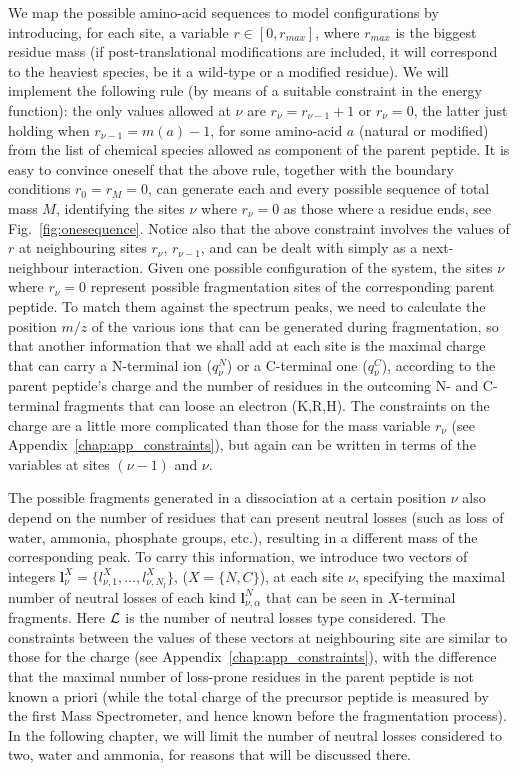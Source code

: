 We map the possible amino-acid sequences to model configurations by introducing,
for each site, a variable $r \in [0,r_{max}]$, where $ r_{max}$ is the biggest
residue mass (if post-translational modifications are included, it will
correspond to the heaviest species, be it a wild-type or a modified residue). We
will implement the following rule (by means of a suitable constraint in the
energy function): the only values allowed at $\nu$ are  $r_{\nu}=r_{\nu-1}+1$ or
$r_{\nu} = 0$, the latter just holding when $r_{\nu-1}=m(a)-1$, for some
amino-acid $a$ (natural or modified) from the list of chemical species allowed as
component of the parent peptide. It is easy to convince oneself that the above
rule, together with the boundary conditions  $r_0=r_M=0$, can generate each and
every possible sequence of total mass $M$, identifying the sites $\nu$ where
$r_{\nu}=0$ as those where a residue ends, see Fig.~\ref{fig:onesequence}.
Notice also that the above constraint involves the values of $r$ at neighbouring
sites $r_{\nu}$, $r_{\nu-1}$, and can be dealt with simply as a next-neighbour
interaction.
Given one possible configuration of the system, the sites $\nu$ where
$r_{\nu}=0$ represent possible fragmentation sites of the corresponding parent
peptide. To match them against the spectrum peaks, we need to calculate the
position $m/z$ of the various ions that can be generated during fragmentation,
so that another information that we shall add at each site is the maximal charge
that can carry a N-terminal ion ($q^N_\nu$) or a C-terminal one ($q^C_\nu$),
according to the parent peptide's charge and the number of residues in the
outcoming N- and C-terminal fragments that can loose an electron (K,R,H). The
constraints on the charge are a little more complicated than those  for the mass
variable $r_{\nu}$ (see Appendix~\ref{chap:app_constraints}), but again can be
written in terms of the variables at sites $(\nu-1)$ and $\nu$.

The possible fragments generated in a dissociation at a certain position $\nu$
also depend on the number of residues that can present neutral losses (such as
loss of water, ammonia, phosphate groups, etc.), resulting in a different mass
of the corresponding peak. To carry this information, we introduce two vectors
of integers  ${\bm l}^X_\nu=\{l^X_{\nu,1},\dots,l^X_{\nu,N_l}\}$,
($X=\{N,C\}$),  at each site $\nu$, specifying the  maximal number of neutral
losses of each kind ${\bm l}^N_{\nu,\alpha}$ that can be seen in $X$-terminal
fragments. Here ${\cal L}$ is the number of neutral losses type considered.
The constraints between the values of these vectors at neighbouring site are
similar to those for the charge (see Appendix~\ref{chap:app_constraints}), with
the difference that the maximal number of loss-prone residues in the parent peptide
is not known a priori (while the total charge of the precursor peptide is
measured by the first Mass Spectrometer, and hence known before the
fragmentation process).
In the following chapter, we will limit the number of neutral losses considered
to two, water and ammonia, for reasons that will be discussed there.

